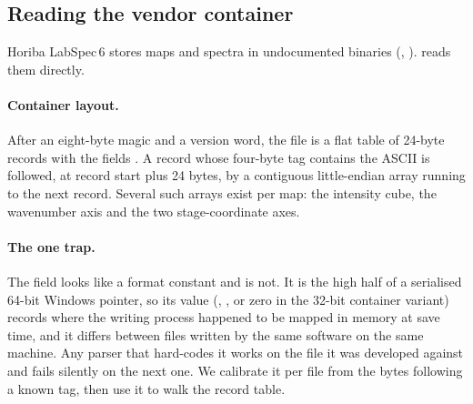 \begin{table}[t]\centering\small
\caption{Composition of the anonymised corpus.}
\label{tab:corpus}
\end{table}


\subsection{Reading the vendor container}
\label{sec:l6}

Horiba LabSpec\,6 stores maps and spectra in undocumented binaries
(, ).  reads them directly.

\paragraph{Container layout.}
After an eight-byte  magic and a version word, the file is a
flat table of 24-byte records with the fields
\code{[type][id][tag][ptr\_hi][val][extra]}. A record whose four-byte tag
contains the ASCII  is followed, at record start plus 24 bytes, by a
contiguous little-endian  array running to the next record.
Several such arrays exist per map: the intensity cube, the wavenumber axis and
the two stage-coordinate axes.

\paragraph{The one trap.}
The  field looks like a format constant and is not. It is the
high half of a serialised 64-bit Windows pointer, so its value
(, , or zero in the 32-bit container variant) records
where the writing process happened to be mapped in memory at save time, and it
differs between files written by the same software on the same machine. Any
parser that hard-codes it works on the file it was developed against and fails
silently on the next one. We calibrate it per file from the bytes following a
known tag, then use it to walk the record table.

